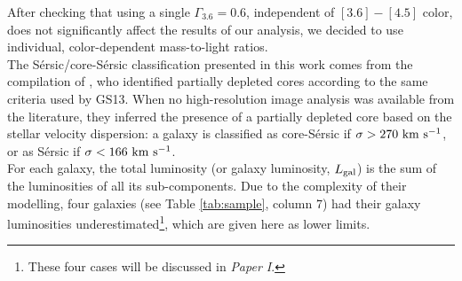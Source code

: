 \documentclass[preprint2]{emulateapj}
\begin{document}
After checking that using a single $\Gamma_{3.6} = 0.6$, independent of $[3.6] - [4.5]$ color, 
does not significantly affect the results of our analysis, 
we decided to use individual, color-dependent mass-to-light ratios. \\
The S\'ersic/core-S\'ersic classification presented in this work 
comes from the compilation of \citet{savorgnangraham2014},
who identified partially depleted cores according to the same criteria used by GS13.
When no high-resolution image analysis was available from the literature, 
they inferred the presence of a partially depleted core based on the stellar velocity dispersion:
a galaxy is classified as core-S\'ersic if $\sigma > 270\rm~km~s^{-1}$,
or as S\'ersic if $\sigma < 166\rm~km~s^{-1}$. \\
For each galaxy, the total luminosity (or galaxy luminosity, $L_{\rm gal}$) is the sum of the luminosities of all its sub-components. 
Due to the complexity of their modelling, 
four galaxies (see Table \ref{tab:sample}, column 7) had their galaxy luminosities 
underestimated\footnote{These four cases will be discussed in \emph{Paper I}.}, 
which are given here as lower limits. 


\end{document}
